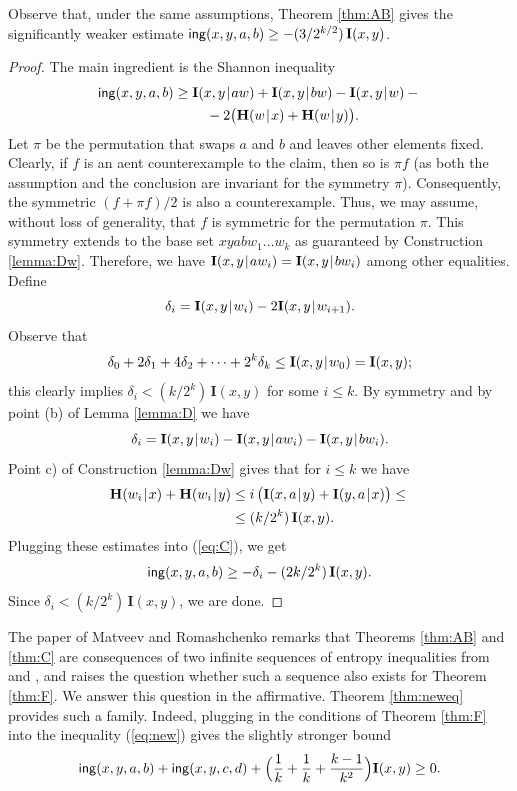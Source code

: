 \documentclass[a4paper]{IEEEtran}
\def\|{\mskip1.5mu{|}\mskip1.5mu}
\def\H{\mathbf H}
\def\I{\mathbf I}
\def\ing[#1,#2,#3,#4]{\mathsf{ing}(#1,#2,#3,#4\mkern 0mu)}
\theoremstyle{definition}
\begin{document}
Observe that, under the same assumptions, Theorem \ref{thm:AB} gives the
significantly weaker estimate $\ing[x,y,a,b]\ge -(3/2^{k/2})\,\I(x,y)$.

\begin{proof}
The main ingredient is the Shannon inequality
\begin{align}\label{eq:C}
\ing[x,y,a,b] &\ge  \I(x,y\|aw)+\I(x,y\|bw)-\I(x,y\|w) - {} \\
     &~~~~~~~  - 2\big(\H(w\|x)+\H(w\|y)\big)\nonumber.
\end{align}
Let $\pi$ be the permutation that swaps $a$ and $b$ and leaves other
elements fixed. Clearly, if $f$ is an aent counterexample to the claim, then
so is $\pi f$ (as both the assumption and the conclusion are invariant for
the symmetry $\pi$). Consequently, the symmetric $(f+\pi f)/2$ is also a
counterexample. Thus, we may assume, without loss of generality, that $f$ is
symmetric for the permutation $\pi$. This symmetry extends to the base set
$xyabw_1\dots w_k$ as guaranteed by Construction \ref{lemma:Dw}.
Therefore, we have $\I(x,y\|aw_i)= \I(x,y\|bw_i)$ among other equalities. Define
$$
   \delta_i=\I(x,y\|w_i)- 2\I(x,y\|w_{i+1}).
$$
Observe that
$$
   \delta_0+2\delta_1+4\delta_2+\cdots+2^k\delta_k \le \I(x,y\|w_0)=\I(x,y);
$$
this clearly implies $\delta_i<(k/2^k)\,\I(x,y)$ for some $i\le k$.
By symmetry and by point (b) of Lemma \ref{lemma:D} we have
$$
   \delta_i = \I(x,y\|w_i)-\I(x,y\|aw_i)-\I(x,y\|bw_i).
$$
Point c) of Construction \ref{lemma:Dw} gives that for $i\le k$ we have
\begin{align*}
  \H(w_i\|x)+\H(w_i\|y) &\le i\,\big(\I(x,a\|y)+\I(y,a\|x)\big) \le {}\\
   &\le (k/2^k)\,\I(x,y).
\end{align*}
Plugging these estimates into (\ref{eq:C}), we get
$$
   \ing[x,y,a,b] \ge -\delta_i - (2k/2^k)\,\I(x,y).
$$
Since $\delta_i<(k/2^k)\,\I(x,y)$, we are done.
\end{proof}

The paper \cite{rom3} of Matveev and Romashchenko remarks that Theorems
\ref{thm:AB} and \ref{thm:C} are consequences of two infinite sequences of
entropy inequalities from \cite{M.infinf} and \cite{DFZ11}, and raises the
question whether such a sequence also exists for Theorem \ref{thm:F}. We
answer this question in the affirmative. Theorem \ref{thm:neweq} provides
such a family. Indeed, plugging in the conditions of Theorem \ref{thm:F}
into the inequality (\ref{eq:new}) gives the slightly stronger bound
$$
   \ing[x,y,a,b]+\ing[x,y,c,d]+\Big(\frac1k+\frac1k+\frac{k-1}{k^2}
   \Big)\I(x,y) \ge 0.
$$
\end{document}
